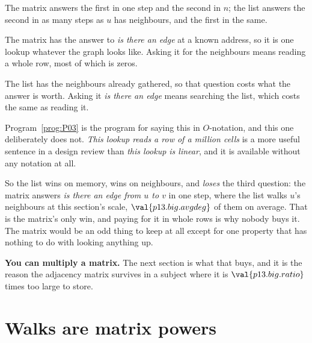 \begin{fr}
\begin{ansblock}
The matrix answers the first in one step and the second in $n$; the list
answers the second in as many steps as $u$ has neighbours, and the first in
the same.
\end{ansblock}

The matrix has the answer to \emph{is there an edge} at a known address, so it
is one lookup whatever the graph looks like. Asking it for the neighbours
means reading a whole row, most of which is zeros.

The list has the neighbours already gathered, so that question costs what the
answer is worth. Asking it \emph{is there an edge} means searching the list,
which costs the same as reading it.

\begin{note}
Program~\ref{prog:P03} is the program for saying this in $O$-notation, and
this one deliberately does not. \emph{This lookup reads a row of a million
cells} is a more useful sentence in a design review than \emph{this lookup is
linear}, and it is available without any notation at all.
\end{note}
\end{fr}

\begin{fr}
So the list wins on memory, wins on neighbours, and \emph{loses} the third
question: the matrix answers \emph{is there an edge from $u$ to $v$} in one
step, where the list walks $u$'s neighbours \dash{} at this section's scale,
$\val{p13.big.avgdeg}$ of them on average. That is the matrix's only win, and
paying for it in whole rows is why nobody buys it. The matrix would be an odd
thing to keep at all \dash{} except for one property that has nothing to do
with looking anything up.

\textbf{You can multiply a matrix.} The next section is what that buys, and it
is the reason the adjacency matrix survives in a subject where it is
$\val{p13.big.ratio}$ times too large to store.
\end{fr}

\section{Walks are matrix powers}
\label{sec:P13-walks}

